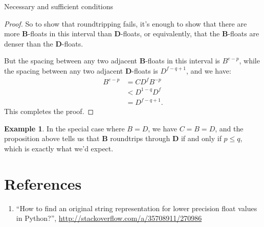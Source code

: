 \documentclass{article}
\theoremstyle{plain}
\theoremstyle{definition}
\newtheorem{example}[lemma]{Example}
\begin{document}
\begin{section}{Necessary and sufficient conditions}
\begin{proof}
  So to show that roundtripping fails, it's enough to show that there are more
  $\mathbf B$-floats in this interval than $\mathbf D$-floats, or equivalently,
  that the $\mathbf B$-floats are denser than the $\mathbf D$-floats.

  But the spacing between any two adjacent $\mathbf B$-floats in this interval
  is $B^{e-p}$, while the spacing between any two adjacent $\mathbf D$-floats
  is $D^{f-q+1}$, and we have:
  \begin{align*}
    B^{e-p}
    &= CD^fB^{-p} \\
    &< D^{1-q}D^f \\
    &= D^{f-q+1}.
  \end{align*}
  This completes the proof.
\end{proof}



\begin{example}
  In the special case where $B=D$, we have $C = B = D$, and the proposition
  above tells us that $\mathbf B$ roundtrips through $\mathbf D$ if and only if
  $p\le q$, which is exactly what we'd expect.
\end{example}

\end{section}

\section*{References}
\begin{enumerate}
  \renewcommand\labelenumi{[\theenumi]}
  \item \label{so1} ``How to find an original string representation for lower
    precision float values in Python?'',
    \url{http://stackoverflow.com/a/35708911/270986}
\end{enumerate}
\end{document}
